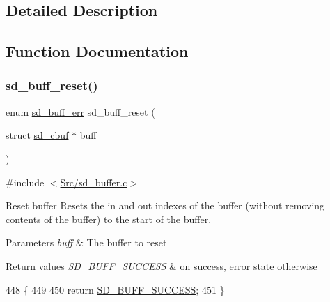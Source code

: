\subsection{Detailed Description}


\subsection{Function Documentation}
\mbox{\label{group___s_d___buffer___functions_gafc321e2e66659aca104810f576224745}} 
\subsubsection{\texorpdfstring{sd\+\_\+buff\+\_\+reset()}{sd\_buff\_reset()}}
{\footnotesize\ttfamily enum \mbox{\hyperlink{group___s_d___buffer___types_ga012d8a07d989f00e3f9c4a2f62743de4}{sd\+\_\+buff\+\_\+err}} sd\+\_\+buff\+\_\+reset (\begin{DoxyParamCaption}\item[{struct \mbox{\hyperlink{structsd__cbuf}{sd\+\_\+cbuf}} $\ast$}]{buff }\end{DoxyParamCaption})}



{\ttfamily \#include $<$\mbox{\hyperlink{sd__buffer_8c}{Src/sd\+\_\+buffer.\+c}}$>$}



Reset buffer Resets the in and out indexes of the buffer (without removing contents of the buffer) to the start of the buffer. 


\begin{DoxyParams}{Parameters}
{\em buff} & The buffer to reset \\
\hline
\end{DoxyParams}

\begin{DoxyRetVals}{Return values}
{\em S\+D\+\_\+\+B\+U\+F\+F\+\_\+\+S\+U\+C\+C\+E\+SS} & on success, error state otherwise \\
\hline
\end{DoxyRetVals}

\begin{DoxyCode}
448 \{
449     
450     \textcolor{keywordflow}{return} \mbox{\hyperlink{group___s_d___buffer___types_gga012d8a07d989f00e3f9c4a2f62743de4a57815778d30aaa889a6e73dfc081e5f6}{SD\_BUFF\_SUCCESS}};
451 \}
\end{DoxyCode}
\mbox{\label{group___s_d___buffer___functions_ga8229d1047f8af8841205582a55bae473}} 
